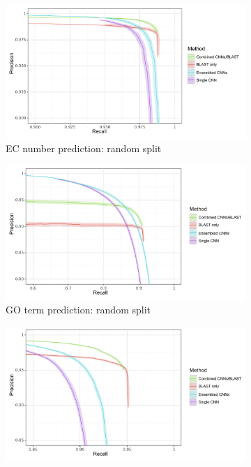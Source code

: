 \begin{figure}[ht] 
  \begin{subfigure}[b]{0.5\linewidth}
    \centering
    \includegraphics[width=1\linewidth]{random_truncated.pdf}
    \caption{EC number prediction: random split} 
    \label{fig:with_ensemble:a} 
    \vspace{4ex}
  \end{subfigure}%
  \begin{subfigure}[b]{0.5\linewidth}
    \centering
    \includegraphics[width=1\linewidth]{random_truncated_go.pdf}
    \caption{GO term prediction: random split} 
    \label{fig:with_ensemble:b} 
    \vspace{4ex}
  \end{subfigure} 
  \begin{subfigure}[b]{0.5\linewidth}
    \centering
    \includegraphics[width=1\linewidth]{clustered_truncated.pdf}

\end{subfigure}
\end{figure}

